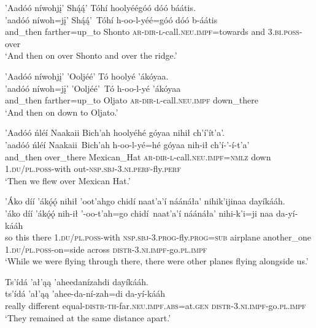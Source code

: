 \ea\label{ex:text9-3-8}
’Aadóó níwohjį’ Shą́ą́’ Tóhí hoolyéégóó dóó báátis.\\
\gll ’aadóó	níwoh=jį’	Shą́ą́’~{Tóhí}	h-oo-l-yéé=góó	dóó	b-áátis\\
     and\_then	farther=up\_to	Shonto	\textsc{ar}-\textsc{dir}-\textsc{l}-call.\textsc{neu}.\textsc{impf}=towards	and	3.\textsc{bi}.\textsc{poss}-over\\
\glt `And then on over Shonto and over the ridge.'
\z

\ea\label{ex:text9-3-9}
’Aadóó níwohjį’ ’Ooljéé’ Tó hoolyé ’ákóyaa.\\
\gll ’aadóó	níwoh=jį’	’Ooljéé’~{Tó}	h-oo-l-yé	’ákóyaa\\
     and\_then	farther=up\_to	Oljato	\textsc{ar}-\textsc{dir}-\textsc{l}-call.\textsc{neu}.\textsc{impf}	down\_there\\
\glt `And then on down to Oljato.'
\z

\ea\label{ex:text9-3-10}
’Aadóó ńléí Naakaii Bich’ah hoolyéhé góyaa nihił ch’í’ít’a’.\\
\gll ’aadóó	ńléí	Naakaii~{Bich’ah}	h-oo-l-yé=hé	góyaa	nih-ił	ch’í-’-í-t’a’\\
     and\_then	over\_there	Mexican\_Hat	\textsc{ar}-\textsc{dir}-\textsc{l}-call.\textsc{neu}.\textsc{impf}=\textsc{nmlz}	down	1.\textsc{du}/\textsc{pl}.\textsc{poss}-with	out-\textsc{nsp}.\textsc{sbj}-3.\textsc{ni}.\textsc{perf}-fly.\textsc{perf}\\
\glt `Then we flew over Mexican Hat.'
\z

\ea\label{ex:text9-3-11}
’Áko díí ’ákǫ́ǫ́ nihił ’oot’ahgo chidí naat’a’í náánáła’ nihik’ijinaa dayíkááh.\\
\gll ’áko	díí	’ákǫ́ǫ́	nih-ił	’-oo-t’ah=go	chidí~{naat’a’í}	náánáła’	nihi-k’i=ji naa da-yí-kááh\\
     so	this	there	1.\textsc{du}/\textsc{pl}.\textsc{poss}-with	\textsc{nsp}.\textsc{sbj}-3.\textsc{prog}-fly.\textsc{prog}=\textsc{sub}	airplane	another\_one	1.\textsc{du}/\textsc{pl}.\textsc{poss}-on=side across \textsc{distr}-3.\textsc{ni}.\textsc{impf}-go.\textsc{pl}.\textsc{impf}\\
\glt `While we were flying through there, there were other planes flying alongside us.'
\z

\newpage
\ea\label{ex:text9-3-12}
Ts’ídá ’ał’ąą ’aheedanízahdi dayíkááh.\\
\gll ts’ídá	’ał’ąą	’ahee-da-ní-zah=di	da-yí-kááh\\
     really	different	equal-\textsc{distr}-\textsc{th}-far.\textsc{neu}.\textsc{impf}.\textsc{abs}=at.\textsc{gen}	\textsc{distr}-3.\textsc{ni}.\textsc{impf}-go.\textsc{pl}.\textsc{impf}\\
\glt `They remained at the same distance apart.'
\z

